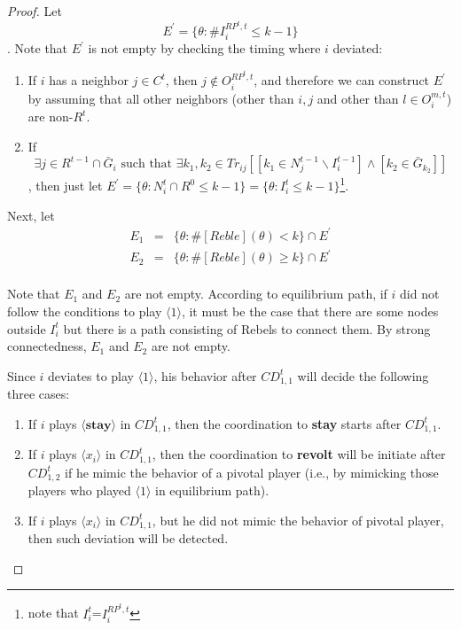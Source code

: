\documentclass[12pt,letterpaper]{article}
\newtheorem*{main result}{Main Result}
\theoremstyle{definition}
\theoremstyle{remark}
\theoremstyle{claim}
\begin{document}
\begin{proof}


Let
\[E^{'}=\{\theta:\#I^{RP^t,t}_i\leq k-1\}\]
. Note that $E^{'}$ is not empty by checking the timing where $i$ deviated:
\begin{enumerate}
\item If $i$ has a neighbor $j\in C^t$, then $j\not\in O^{RP^t,t}_i$, and therefore we can construct $E^{'}$ by assuming that all other neighbors (other than $i,j$ and other than $l\in O^{m,t}_i$) are non-$R^t$.
\item If \[\exists j\in R^{t-1}\cap \bar{G}_i \text{ such that } \exists k_1,k_2\in Tr_{ij}[[k_1\in N^{t-1}_j\backslash I^{t-1}_i] \wedge [k_2\in \bar{G}_{k_2}]]\], then just let $E^{'}=\{\theta: N^t_i\cap R^0\leq k-1\}=\{\theta: I^t_i\leq k-1\}$\footnote{note that $I^t_i$=$I^{RP^t,t}_i$}.
\end{enumerate}

Next, let 
\begin{eqnarray*}
E_1&=&\{\theta: \#[Reble](\theta)<k\}\cap E^{'}\\
E_2&=&\{\theta: \#[Reble](\theta)\geq k\}\cap E^{'}\\
\end{eqnarray*}

Note that $E_1$ and $E_2$ are not empty. According to equilibrium path, if $i$ did not follow the conditions to play $\langle 1 \rangle$, it must be the case that there are some nodes outside $I^t_i$ but there is a path consisting of Rebels to connect them. By strong connectedness, $E_1$ and $E_2$ are not empty.

Since $i$ deviates to play $\langle 1 \rangle$, his behavior after $CD^t_{1,1}$ will decide the following three cases:
\begin{enumerate}
\item If $i$ plays $\langle \textbf{stay} \rangle$ in $CD^t_{1,1}$, then the coordination to \textbf{stay} starts after $CD^t_{1,1}$.
\item If $i$ plays $\langle x_i \rangle$ in $CD^t_{1,1}$, then the coordination to \textbf{revolt} will be initiate after $CD^t_{1,2}$ if he mimic the behavior of a pivotal player (i.e., by mimicking those players who played $\langle 1 \rangle$ in equilibrium path).
\item If $i$ plays $\langle x_i \rangle$ in $CD^t_{1,1}$, but he did not mimic the behavior of pivotal player, then such deviation will be detected.
\end{enumerate}


\end{proof}
\end{document}
